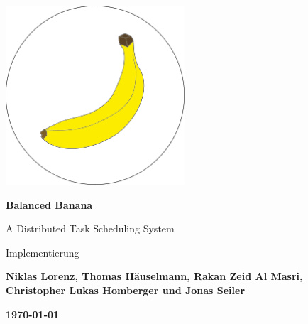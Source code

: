 \begin{titlepage}
    \begin{center}
    
     \vspace*{0.8cm}
 
        \includegraphics[width=0.5\textwidth]{balancedbanana}
        \vspace*{1cm}
 
        \Huge
        \textbf{Balanced Banana}
 
        \vspace{0.5cm}
        \LARGE
        A Distributed Task Scheduling System
        
        \vspace{0.5 cm}
        \LARGE
        Implementierung
 
        \vspace{1.5cm}

        \large
        \textbf{Niklas Lorenz, Thomas Häuselmann, Rakan Zeid Al Masri, Christopher Lukas Homberger und Jonas Seiler}
 
        \vspace*{0.5cm}

        \textbf{\today}
 
       
        
 
    \end{center}
\end{titlepage}